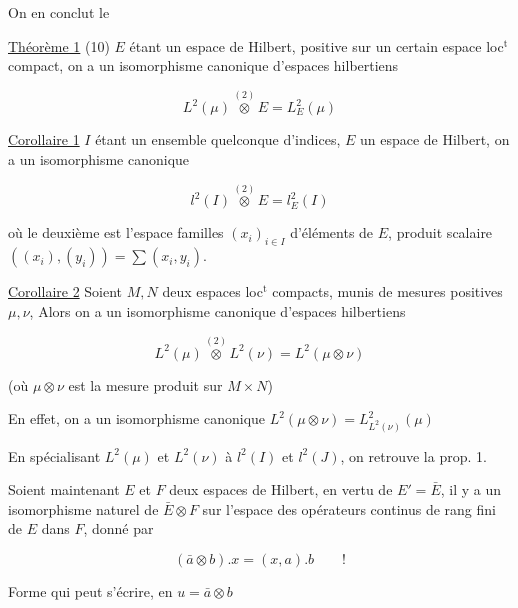 On en conclut le

\uline{Théorème 1} (10) $E$ étant un espace de Hilbert,   positive sur un certain espace loc$^{\mathrm{t}}$ compact,
on a un isomorphisme canonique d'espaces hilbertiens

\[
L^2(\mu)\overset{(2)}{\otimes}E=L^2_E(\mu) \tag*{(11)}
\]

\uline{Corollaire 1} $I$ étant un ensemble quelconque d'indices, $E$
un  espace de Hilbert, on a un isomorphisme
canonique

\[
l^2(I)\overset{(2)}{\otimes}E=l^2_E(I) \tag*{(12)}
\]

où le deuxième  est l'espace  
 familles  $(x_i)_{i\in I}$ d'éléments de $E$,  
  produit scalaire $((x_i),(y_i))=\sum(x_i,y_i)$.

\uline{Corollaire 2} Soient $M,N$ deux espaces loc$^{\mathrm{t}}$ compacts,
munis de mesures positives $\mu,\nu$, Alors  on
a un isomorphisme canonique d'espaces hilbertiens

\[
L^2(\mu)\overset{(2)}{\otimes}L^2(\nu)=L^2(\mu\otimes\nu) \tag*{(13)}
\]

(où $\mu\otimes\nu$ est la mesure produit  sur $M\times N$)

En effet, on a un isomorphisme canonique $L^2(\mu\otimes\nu)=L^2_{L^2(\nu)}(\mu)$

En spécialisant $L^2(\mu)$ et $L^2(\nu)$ à $l^2(I)$ et $l^2(J)$, on
 retrouve la prop. 1.

Soient maintenant $E$ et $F$ deux espaces de Hilbert,
en vertu de $E'=\bar E$,  il y a un
isomorphisme naturel de $\bar E\otimes F$ sur l'espace des
opérateurs  continus de rang fini de
$E$ dans $F$, donné par

\[
(\bar a\otimes b).x=(x,a).b\qquad! \tag*{(14)}
\]

 Forme qui peut s'écrire, en    $u=\bar a\otimes b$

